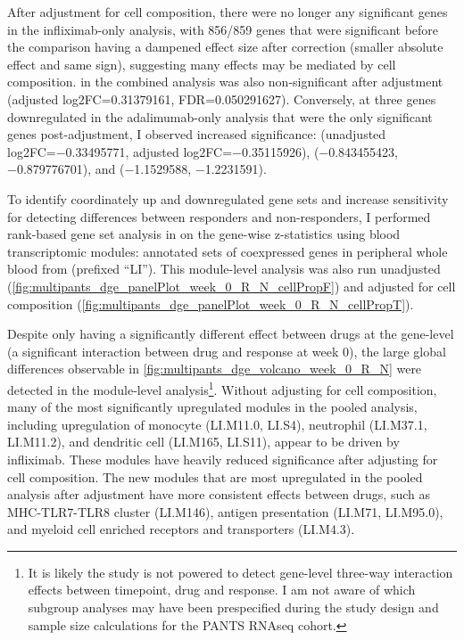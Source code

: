 After adjustment for cell composition, there were no longer any significant genes in the infliximab-only analysis, 
with 856/859 genes that were significant before the comparison having a dampened effect size after correction (smaller absolute effect and same sign), suggesting many effects may be mediated by cell composition.
 in the combined analysis was also non-significant after adjustment (adjusted log2FC=\num{0.31379161}, FDR=\num{0.050291627}).
Conversely, at three genes downregulated in the adalimumab-only analysis that were the only significant genes post-adjustment, I observed increased significance:
 (unadjusted log2FC=\num{-0.33495771}, adjusted log2FC=\num{-0.35115926}), 
 (\num{-0.843455423}, \num{-0.879776701}), 
and  (\num{-1.1529588}, \num{-1.2231591}).

To identify coordinately up and downregulated gene sets and increase sensitivity for detecting differences between responders and non-responders,
I performed rank-based gene set analysis in on the gene-wise z-statistics using blood transcriptomic modules: annotated sets of coexpressed genes in peripheral whole blood from \textcite{li2013MolecularSignaturesAntibody} (prefixed \enquote{LI}).
This module-level analysis was also run unadjusted (\autoref{fig:multipants_dge_panelPlot_week_0_R_N_cellPropF}) and adjusted for cell composition (\autoref{fig:multipants_dge_panelPlot_week_0_R_N_cellPropT}).

Despite only  having a significantly different effect between drugs at the gene-level (a significant interaction between drug and response at week 0), 
the large global differences observable in \autoref{fig:multipants_dge_volcano_week_0_R_N} were detected in the module-level analysis\footnote{
It is likely the study is not powered to detect gene-level three-way interaction effects between timepoint, drug and response.
I am not aware of which subgroup analyses may have been prespecified during the study design and sample size calculations for the \gls{PANTS} \gls{RNAseq} cohort.
}.
Without adjusting for cell composition, many of the most significantly upregulated modules in the pooled analysis, 
including upregulation of monocyte (LI.M11.0, LI.S4), neutrophil (LI.M37.1, LI.M11.2), and dendritic cell (LI.M165, LI.S11),
appear to be driven by infliximab.
These modules have heavily reduced significance after adjusting for cell composition.
The new modules that are most upregulated in the pooled analysis after adjustment have more consistent effects between drugs, such as
MHC-TLR7-TLR8 cluster (LI.M146), antigen presentation (LI.M71, LI.M95.0), and myeloid cell enriched receptors and transporters (LI.M4.3).

